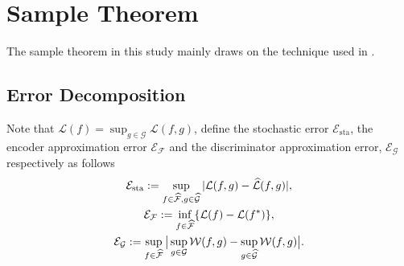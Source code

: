 \section{Sample Theorem}\label{section: Appendix B}
The sample theorem in this study mainly draws on the technique used in \citet{duan2024unsupervisedtransferlearningadversarial}.
\subsection{Error Decomposition}
Note that $\mathcal{L}(f) = \sup_{g \in \mathcal{G}}\mathcal{L}(f, g)$, define the stochastic error $\mathcal{E}_{\mathrm{sta}}$, the encoder approximation error $\mathcal{E}_{\mathcal{F}}$ and the discriminator approximation error, $\mathcal{E}_{\mathcal{G}}$ respectively as follows
\begin{gather*}
    \mathcal{E}_{\mathrm{sta}} := \sup_{f \in \widehat{\mathcal{F}}, g \in \widehat{\mathcal{G}}}\vert{\mathcal{L}(f, g) - \widehat{\mathcal{L}}(f, g)}\vert,\\ 
    \mathcal{E}_{\mathcal{F}} := \inf_{f \in \widehat{\mathcal{F}}}\{\mathcal{L}(f) - \mathcal{L}(f^*)\}, \\
    \mathcal{E}_{\mathcal{G}} := \sup_{f \in \widehat{\mathcal{F}}}\big\vert\sup_{g \in \mathcal{G}}\mathcal{W}(f, g) - \sup_{g \in \widehat{\mathcal{G}}}\mathcal{W}(f, g)\big\vert.
\end{gather*}

